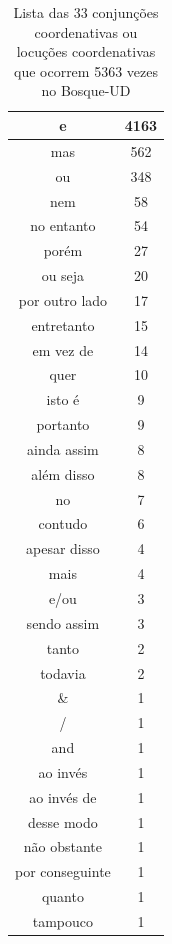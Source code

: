 \documentclass[output=paper,colorlinks,citecolor=brown]{langscibook}
\begin{document}
\begin{table}[]
{\begin{tabular}{|c|c|}
				e & 4163\\\hline
				mas & 562\\\hline
				ou & 348\\\hline
				nem & 58\\\hline
				no entanto & 54\\\hline
				porém & 27\\\hline
				ou seja & 20\\\hline
				por outro lado & 17\\\hline
				entretanto & 15\\\hline
				em vez de & 14\\\hline
				quer & 10\\\hline
				isto é & 9\\\hline
				portanto & 9\\\hline
				ainda assim & 8\\\hline
				além disso & 8\\\hline
				no & 7\\\hline
				contudo & 6\\\hline
				apesar disso & 4\\\hline
				mais & 4\\\hline
				e/ou & 3\\\hline
				sendo assim & 3\\\hline
				tanto & 2\\\hline
				todavia & 2\\\hline
				\& & 1\\\hline
				/ & 1\\\hline
				and & 1\\\hline
				ao invés & 1\\\hline
				ao invés de & 1\\\hline
				desse modo & 1\\\hline
				não obstante & 1\\\hline
				por conseguinte & 1\\\hline
				quanto & 1\\\hline
				tampouco & 1\\\hline
			\end{tabular}
		}
		\caption{Lista das 33 conjunções coordenativas ou locuções coordenativas que ocorrem 5363 vezes no Bosque-UD}
		\label{tab:cconj}
	\end{table}	
\end{document}
